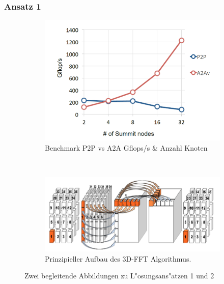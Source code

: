 \subsubsection{Ansatz 1}
\begin{figure}
	\begin{subfigure}[t]{0.5\textwidth}
		\centering
		\includegraphics[width=1\textwidth]{res/bench.png}
		\caption{\cite[Abb. 5]{mainpaper} Benchmark P2P vs A2A Gflops/s \& Anzahl Knoten}
		\label{fig:bench}
	\end{subfigure}
~
	\begin{subfigure}[t]{0.5\textwidth}
		\centering
		\includegraphics[width=1\textwidth]{res/algo.png}
		\caption{\cite[Abb. 2]{mainpaper} Prinzipieller Aufbau des 3D-FFT Algorithmus. }
		\label{fig:algo}
	\end{subfigure}
	\caption{Zwei begleitende Abbildungen zu L"osungsans"atzen 1 und 2}
\end{figure}


